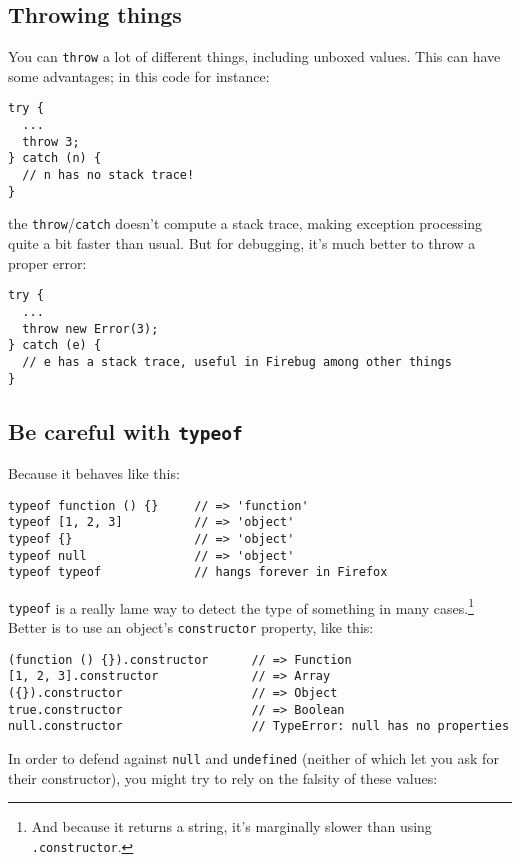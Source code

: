 \documentclass{article}
\begin{document}
\subsection {Throwing things}
    You can \verb|throw| a lot of different things, including unboxed values. This can have some advantages; in this code for instance:

\begin{verbatim}
try {
  ...
  throw 3;
} catch (n) {
  // n has no stack trace!
}
\end{verbatim}

    \noindent the \verb|throw|/\verb|catch| doesn't compute a stack trace, making exception processing quite a bit faster than usual. But for debugging, it's much better to throw a proper
    error:

\begin{verbatim}
try {
  ...
  throw new Error(3);
} catch (e) {
  // e has a stack trace, useful in Firebug among other things
}
\end{verbatim}

\subsection {Be careful with {\tt typeof}}
    Because it behaves like this:

\begin{verbatim}
typeof function () {}     // => 'function'
typeof [1, 2, 3]          // => 'object'
typeof {}                 // => 'object'
typeof null               // => 'object'
typeof typeof             // hangs forever in Firefox
\end{verbatim}

    {\tt typeof} is a really lame way to detect the type of something in many cases.\footnote{And because it returns a string, it's marginally slower than using {\tt .constructor}.} Better is
    to use an object's \verb|constructor| property, like this:

\begin{verbatim}
(function () {}).constructor      // => Function
[1, 2, 3].constructor             // => Array
({}).constructor                  // => Object
true.constructor                  // => Boolean
null.constructor                  // TypeError: null has no properties
\end{verbatim}

    In order to defend against \verb|null| and \verb|undefined| (neither of which let you ask for their constructor), you might try to rely on the falsity of these values:
\end{document}
